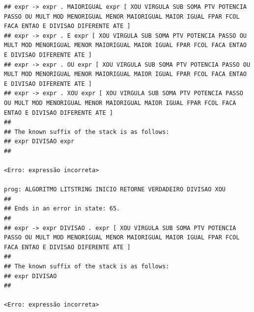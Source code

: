 \documentclass[hidelinks,12pt]{article}
\begin{document}
\begin{lstlisting}
## expr -> expr . MAIORIGUAL expr [ XOU VIRGULA SUB SOMA PTV POTENCIA PASSO OU MULT MOD MENORIGUAL MENOR MAIORIGUAL MAIOR IGUAL FPAR FCOL FACA ENTAO E DIVISAO DIFERENTE ATE ]
## expr -> expr . E expr [ XOU VIRGULA SUB SOMA PTV POTENCIA PASSO OU MULT MOD MENORIGUAL MENOR MAIORIGUAL MAIOR IGUAL FPAR FCOL FACA ENTAO E DIVISAO DIFERENTE ATE ]
## expr -> expr . OU expr [ XOU VIRGULA SUB SOMA PTV POTENCIA PASSO OU MULT MOD MENORIGUAL MENOR MAIORIGUAL MAIOR IGUAL FPAR FCOL FACA ENTAO E DIVISAO DIFERENTE ATE ]
## expr -> expr . XOU expr [ XOU VIRGULA SUB SOMA PTV POTENCIA PASSO OU MULT MOD MENORIGUAL MENOR MAIORIGUAL MAIOR IGUAL FPAR FCOL FACA ENTAO E DIVISAO DIFERENTE ATE ]
##
## The known suffix of the stack is as follows:
## expr DIVISAO expr 
##

<Erro: expressão incorreta>

prog: ALGORITMO LITSTRING INICIO RETORNE VERDADEIRO DIVISAO XOU 
##
## Ends in an error in state: 65.
##
## expr -> expr DIVISAO . expr [ XOU VIRGULA SUB SOMA PTV POTENCIA PASSO OU MULT MOD MENORIGUAL MENOR MAIORIGUAL MAIOR IGUAL FPAR FCOL FACA ENTAO E DIVISAO DIFERENTE ATE ]
##
## The known suffix of the stack is as follows:
## expr DIVISAO 
##

<Erro: expressão incorreta>


\end{lstlisting}
\end{document}
